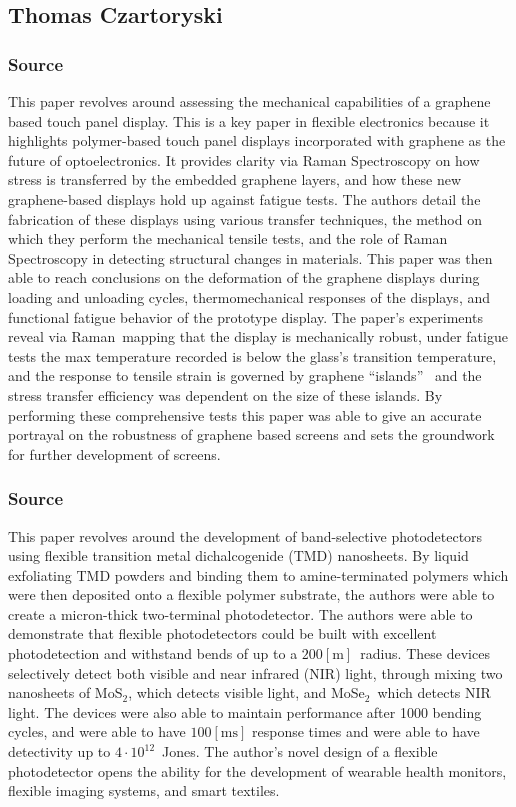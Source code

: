 \documentclass[conference]{IEEEtran}
\begin{document}
\subsection{Thomas Czartoryski}

\subsubsection{Source \cite{tc6}}

This paper revolves around assessing the mechanical capabilities of a graphene based touch panel display. This is a key paper in flexible electronics because it highlights polymer-based touch panel displays incorporated with graphene as the future of optoelectronics. It provides clarity via Raman Spectroscopy on how stress is transferred by the embedded graphene layers, and how these new graphene-based displays hold up against fatigue tests. The authors detail the fabrication of these displays using various transfer techniques, the method on which they perform the mechanical tensile tests, and the role of Raman Spectroscopy in detecting structural changes in materials. This paper was then able to reach conclusions on the deformation of the graphene displays during loading and unloading cycles, thermomechanical responses of the displays, and functional fatigue behavior of the prototype display. The paper's experiments reveal via Raman mapping that the display is mechanically robust, under fatigue tests the max temperature recorded is below the glass’s transition temperature, and the response to tensile strain is governed by graphene ``islands''  and the stress transfer efficiency was dependent on the size of these islands. By performing these comprehensive tests this paper was able to give an accurate portrayal on the robustness of graphene based screens and sets the groundwork for further development of screens.

\subsubsection{Source \cite{tc9}}
 
This paper revolves around the development of band-selective photodetectors using flexible transition metal dichalcogenide (TMD) nanosheets. By liquid exfoliating TMD powders and binding them to amine-terminated polymers which were then deposited onto a flexible polymer substrate, the authors were able to create a micron-thick two-terminal photodetector. The authors were able to demonstrate that flexible photodetectors could be built with excellent photodetection and withstand bends of up to a $200[\si{\meter}]$ radius. These devices selectively detect both visible and near infrared (NIR) light, through mixing two nanosheets of MoS$_2$, which detects visible light, and MoSe$_2$ which detects NIR light. The devices were also able to maintain performance after 1000 bending cycles, and were able to have $100[\si{\milli\second}]$ response times and were able to have detectivity up to $4\cdot10^{12}$ Jones. The author's novel design of a flexible photodetector opens the ability for the development of wearable health monitors, flexible imaging systems, and smart textiles.
\end{document}
